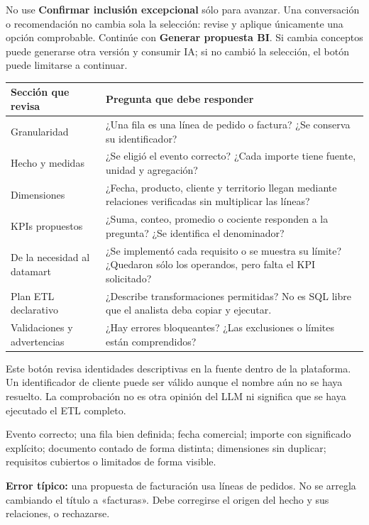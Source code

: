 No use \textbf{Confirmar inclusión excepcional} sólo para avanzar. Una conversación o recomendación no cambia sola la selección: revise y aplique únicamente una opción comprobable. Continúe con \textbf{Generar propuesta BI}. Si cambia conceptos puede generarse otra versión y consumir IA; si no cambió la selección, el botón puede limitarse a continuar.
\begin{tabularx}{\linewidth}{@{}p{41mm}Y@{}}
\toprule
\textbf{Sección que revisa}&\textbf{Pregunta que debe responder}\\
\midrule
Granularidad&¿Una fila es una línea de pedido o factura? ¿Se conserva su identificador?\\
Hecho y medidas&¿Se eligió el evento correcto? ¿Cada importe tiene fuente, unidad y agregación?\\
Dimensiones&¿Fecha, producto, cliente y territorio llegan mediante relaciones verificadas sin multiplicar las líneas?\\
KPIs propuestos&¿Suma, conteo, promedio o cociente responden a la pregunta? ¿Se identifica el denominador?\\
De la necesidad al datamart&¿Se implementó cada requisito o se muestra su límite? ¿Quedaron sólo los operandos, pero falta el KPI solicitado?\\
Plan ETL declarativo&¿Describe transformaciones permitidas? No es SQL libre que el analista deba copiar y ejecutar.\\
Validaciones y advertencias&¿Hay errores bloqueantes? ¿Las exclusiones o límites están comprendidos?\\
\bottomrule
\end{tabularx}
Este botón revisa identidades descriptivas en la fuente dentro de la plataforma. Un identificador de cliente puede ser válido aunque el nombre aún no se haya resuelto. La comprobación no es otra opinión del LLM ni significa que se haya ejecutado el ETL completo.
\begin{good}
Evento correcto; una fila bien definida; fecha comercial; importe con significado explícito; documento contado de forma distinta; dimensiones sin duplicar; requisitos cubiertos o limitados de forma visible.
\end{good}
\textbf{Error típico:} una propuesta de facturación usa líneas de pedidos. No se arregla cambiando el título a «facturas». Debe corregirse el origen del hecho y sus relaciones, o rechazarse.

